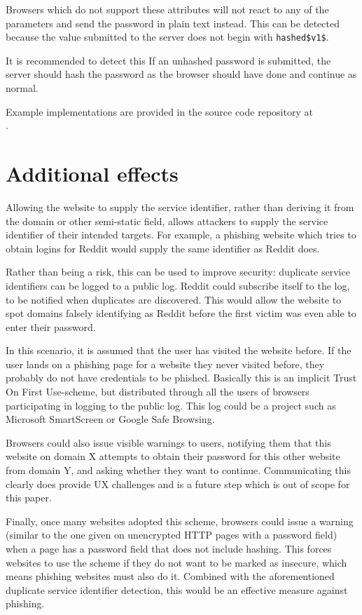 \documentclass{paper}
\newcommand{\code}[1]{\texttt{\colorbox{gray!11}{#1}}}
\begin{document}
Browsers which do not support these attributes will not react to any of the parameters and
send the password in plain text instead. This can be detected because the value submitted to
the server does not begin with \code{hashed\$v1\$}.

It is recommended to detect this If an unhashed password is submitted, the server should hash
the password as the browser should have done and continue as normal.

Example implementations are provided in the source code repository at \\
{\href{https://github.com/lgommans/browserhashing}{\underline{}}}.

\section{Additional effects}

Allowing the website to supply the service identifier, rather than deriving it from the
domain or other semi-static field, allows attackers to supply the service identifier of their
intended targets. For example, a phishing website which tries to obtain logins for Reddit
would supply the same identifier as Reddit does.

Rather than being a risk, this can be used to improve security: duplicate service identifiers
can be logged to a public log. Reddit could subscribe itself to the log, to be notified
when duplicates are discovered. This would allow the website to spot domains falsely
identifying as Reddit before the first victim was even able to enter their password.

In this scenario, it is assumed that the user has visited the website before. If the user
lands on a phishing page for a website they never visited before, they probably do not have
credentials to be phished. Basically this is an implicit Trust On First Use-scheme, but
distributed through all the users of browsers participating in logging to the public log.
This log could be a project such as Microsoft SmartScreen or Google Safe Browsing.

Browsers could also issue visible warnings to users, notifying them that this website on
domain X attempts to obtain their password for this other website from domain Y, and asking
whether they want to continue. Communicating this clearly does provide UX challenges and is a
future step which is out of scope for this paper.

Finally, once many websites adopted this scheme, browsers could issue a warning (similar to
the one given on unencrypted HTTP pages with a password field) when a page has a password
field that does not include hashing. This forces websites to use the scheme if they do not
want to be marked as insecure, which means phishing websites must also do it. Combined with
the aforementioned duplicate service identifier detection, this would be an effective measure
against phishing.
\end{document}
